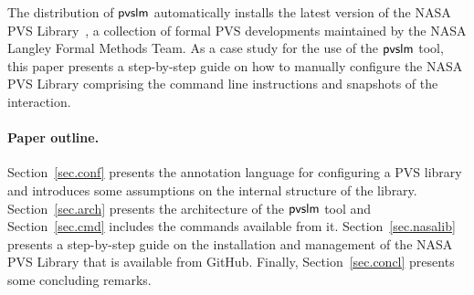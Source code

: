The distribution of $\textsf{pvslm}$ automatically installs the latest version
of the NASA PVS Library~\cite{nasalib}, a collection of formal PVS
developments maintained by the NASA Langley Formal Methods Team. As a
case study for the use of the $\textsf{pvslm}$ tool, this paper presents a
step-by-step guide on how to manually configure the NASA PVS Library
comprising the command line instructions and snapshots of the
interaction.

\paragraph{Paper outline.} Section~\ref{sec.conf} presents the
annotation language for configuring a PVS library and introduces some
assumptions on the internal structure of the library.
Section~\ref{sec.arch} presents the architecture of the $\textsf{pvslm}$ tool
and Section~\ref{sec.cmd} includes the commands available from it.
Section~\ref{sec.nasalib} presents a step-by-step guide on the
installation and management of the NASA PVS Library that is available
from GitHub. Finally, Section~\ref{sec.concl} presents some concluding
remarks.
